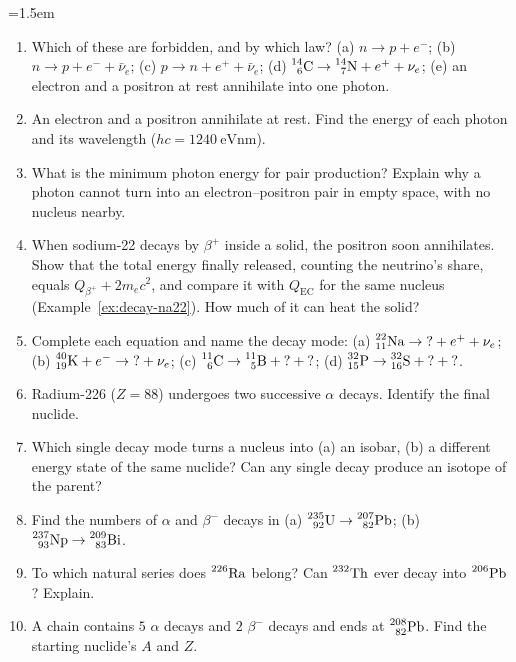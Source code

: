 \begingroup\emergencystretch=1.5em
\begin{enumerate}[itemsep=3pt]
\item\label{prob:decay-allowed} Which of these are forbidden, and by which law? (a) $n\to p+e^-$;
      (b) $n\to p+e^-+\bar\nu_e$; (c) $p\to n+e^++\bar\nu_e$; (d) $\prescript{14}{6}{\mathrm{C}}\to\prescript{14}{7}{\mathrm{N}}+e^++\nu_e$;
      (e) an electron and a positron at rest annihilate into one photon.
\item\label{prob:decay-annih} An electron and a positron annihilate at rest. Find the energy of each photon
      and its wavelength ($hc=\SI{1240}{\eV\nano\metre}$).
\item\label{prob:decay-pair} What is the minimum photon energy for pair production? Explain why a photon
      cannot turn into an electron--positron pair in empty space, with no nucleus nearby.
\item\label{prob:decay-na22total} When sodium-22 decays by $\beta^+$ inside a solid, the positron soon
      annihilates. Show that the total energy finally released, counting the neutrino's share, equals
      $Q_{\beta^+}+2m_ec^2$, and compare it with $Q_{\mathrm{EC}}$ for the same nucleus
      (Example~\ref{ex:decay-na22}). How much of it can heat the solid?
\item\label{prob:decay-compl} Complete each equation and name the decay mode:
      (a) $\prescript{22}{11}{\mathrm{Na}}\to{?}+e^++\nu_e$; (b) $\prescript{40}{19}{\mathrm{K}}+e^-\to{?}+\nu_e$;
      (c) $\prescript{11}{6}{\mathrm{C}}\to\prescript{11}{5}{\mathrm{B}}+{?}+{?}$; (d) $\prescript{32}{15}{\mathrm{P}}\to\prescript{32}{16}{\mathrm{S}}+{?}+{?}$.
\item\label{prob:decay-ra2a} Radium-226 ($Z=88$) undergoes two successive $\alpha$ decays. Identify the final
      nuclide.
\item\label{prob:decay-isobar} Which single decay mode turns a nucleus into (a) an isobar, (b) a different
      energy state of the same nuclide? Can any single decay produce an isotope of the parent?
\item\label{prob:decay-u235} Find the numbers of $\alpha$ and $\beta^-$ decays in
      (a) $\prescript{235}{92}{\mathrm{U}}\to\prescript{207}{82}{\mathrm{Pb}}$; (b) $\prescript{237}{93}{\mathrm{Np}}\to\prescript{209}{83}{\mathrm{Bi}}$.
\item\label{prob:decay-mod4} To which natural series does $\prescript{226}{}{\mathrm{Ra}}$ belong? Can $\prescript{232}{}{\mathrm{Th}}$ ever
      decay into $\prescript{206}{}{\mathrm{Pb}}$? Explain.
\item\label{prob:decay-back} A chain contains $5$ $\alpha$ decays and $2$ $\beta^-$ decays and ends at
      $\prescript{208}{82}{\mathrm{Pb}}$. Find the starting nuclide's $A$ and $Z$.

\end{enumerate}
